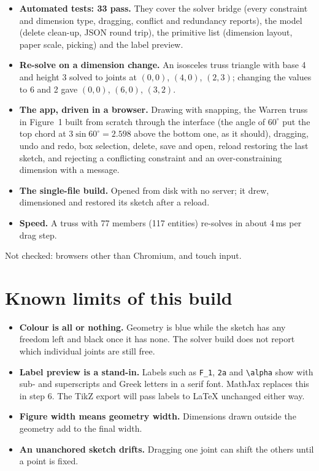 \documentclass[10pt,a4paper]{article}
\newcommand{\code}[1]{\texttt{#1}}
\begin{document}
\begin{itemize}
\item \textbf{Automated tests: 33 pass.} They cover the solver bridge (every
constraint and dimension type, dragging, conflict and redundancy reports),
the model (delete clean-up, JSON round trip), the primitive list (dimension
layout, paper scale, picking) and the label preview.
\item \textbf{Re-solve on a dimension change.} An isosceles truss triangle
with base 4 and height 3 solved to joints at $(0,0)$, $(4,0)$, $(2,3)$;
changing the values to 6 and 2 gave $(0,0)$, $(6,0)$, $(3,2)$.
\item \textbf{The app, driven in a browser.} Drawing with snapping, the
Warren truss in Figure~1 built from scratch through the interface
(the angle of $60^\circ$ put the top chord at $3\sin 60^\circ = 2.598$ above
the bottom one, as it should), dragging, undo and redo, box selection,
delete, save and open, reload restoring the last sketch, and rejecting a
conflicting constraint and an over-constraining dimension with a message.
\item \textbf{The single-file build.} Opened from disk with no server; it
drew, dimensioned and restored its sketch after a reload.
\item \textbf{Speed.} A truss with 77 members (117 entities) re-solves in about 4\,ms
per drag step.
\end{itemize}

Not checked: browsers other than Chromium, and touch input.

\section{Known limits of this build}

\begin{itemize}
\item \textbf{Colour is all or nothing.} Geometry is blue while the sketch has
any freedom left and black once it has none. The solver build does not report
which individual joints are still free.
\item \textbf{Label preview is a stand-in.} Labels such as \code{F\_1},
\code{2a} and \code{\textbackslash alpha} show with sub- and superscripts and
Greek letters in a serif font. MathJax replaces this in step 6. The TikZ
export will pass labels to \LaTeX{} unchanged either way.
\item \textbf{Figure width means geometry width.} Dimensions drawn outside the
geometry add to the final width.
\item \textbf{An unanchored sketch drifts.} Dragging one joint can shift the
others until a point is fixed.
\end{itemize}
\end{document}
